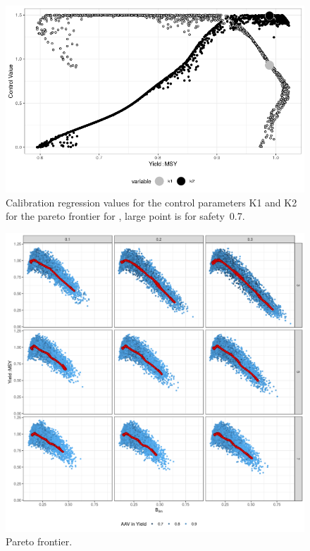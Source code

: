 \documentclass[12pt,doublespacing,a4paper]{ouparticle}
\begin{document}
\newpage
\begin{figure}[h]
\centering
\includegraphics[width=\textwidth]{figs-figYield-1.png}
\caption{Calibration regression values for the control parameters K1 and K2 for the pareto frontier for , large point is for safety~0.7.}
\label{fig:control}
\end{figure}

\newpage
\begin{figure}[h]
\centering
\includegraphics[width=\textwidth]{scenarios-unnamed-chunk-4-1.png}
\caption{Pareto frontier.}
\label{fig:voi}
\end{figure}
\end{document}
